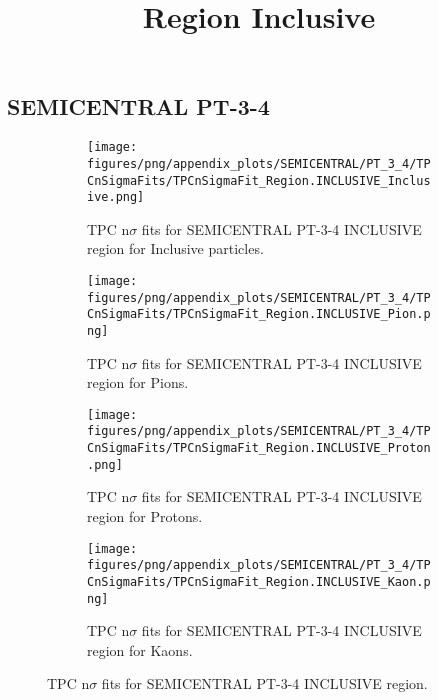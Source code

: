             \subsection{SEMICENTRAL PT-3-4}
            \begin{figure}[H]
                \title{Region Inclusive}
                \begin{subfigure}[b]{0.5\textwidth}
                    \centering
                    \texttt{[image: figures/png/appendix\_plots/SEMICENTRAL/PT\_3\_4/TPCnSigmaFits/TPCnSigmaFit\_Region.INCLUSIVE\_Inclusive.png]}
                    \caption{TPC n$\sigma$ fits for SEMICENTRAL PT-3-4 INCLUSIVE region for Inclusive particles.}
                    \label{fig:appendix_SEMICENTRAL_PT-3-4_INCLUSIVE_Inclusive}
                \end{subfigure}
                \begin{subfigure}[b]{0.5\textwidth}
                    \centering
                    \texttt{[image: figures/png/appendix\_plots/SEMICENTRAL/PT\_3\_4/TPCnSigmaFits/TPCnSigmaFit\_Region.INCLUSIVE\_Pion.png]}
                    \caption{TPC n$\sigma$ fits for SEMICENTRAL PT-3-4 INCLUSIVE region for Pions.}
                    \label{fig:appendix_SEMICENTRAL_PT-3-4_INCLUSIVE_Pion}
                \end{subfigure}
                \begin{subfigure}[b]{0.5\textwidth}
                    \centering
                    \texttt{[image: figures/png/appendix\_plots/SEMICENTRAL/PT\_3\_4/TPCnSigmaFits/TPCnSigmaFit\_Region.INCLUSIVE\_Proton.png]}
                    \caption{TPC n$\sigma$ fits for SEMICENTRAL PT-3-4 INCLUSIVE region for Protons.}
                    \label{fig:appendix_SEMICENTRAL_PT-3-4_INCLUSIVE_Proton}
                \end{subfigure}
                \begin{subfigure}[b]{0.5\textwidth}
                    \centering
                    \texttt{[image: figures/png/appendix\_plots/SEMICENTRAL/PT\_3\_4/TPCnSigmaFits/TPCnSigmaFit\_Region.INCLUSIVE\_Kaon.png]}
                    \caption{TPC n$\sigma$ fits for SEMICENTRAL PT-3-4 INCLUSIVE region for Kaons.}
                    \label{fig:appendix_SEMICENTRAL_PT-3-4_INCLUSIVE_Kaon}
                \end{subfigure}
                \caption{TPC n$\sigma$ fits for SEMICENTRAL PT-3-4 INCLUSIVE region.}
                \label{fig:appendix_SEMICENTRAL_PT-3-4_INCLUSIVE}
            \end{figure}
